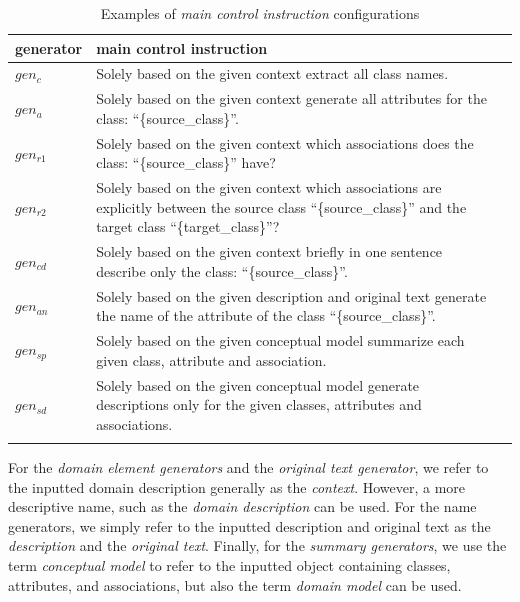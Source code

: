 \begin{table}[!h]
    \scriptsize
    \centering
    \setlength{\tabcolsep}{0.5em}
\begin{tabular}{@{}l>{\raggedright\arraybackslash}p{}>{\raggedright\arraybackslash}p{}@{}}
    generator & main control instruction \\
    \toprule
    \addlinespace
    
$gen_c$ & Solely based on the given context extract all class names. \\
\addlinespace

$gen_a$ & Solely based on the given context generate all attributes for the class: ``\{source\_class\}''. \\
\addlinespace

$gen_{r1}$ & Solely based on the given context which associations does the class: ``\{source\_class\}'' have? \\
\addlinespace

$gen_{r2}$ & Solely based on the given context which associations are explicitly between the source class ``\{source\_class\}'' and the target class ``\{target\_class\}''? \\
\addlinespace

$gen_{cd}$ & Solely based on the given context briefly in one sentence describe only the class: ``\{source\_class\}''. \\
\addlinespace

$gen_{an}$ & Solely based on the given description and original text generate the name of the attribute of the class ``\{source\_class\}''. \\
\addlinespace

$gen_{sp}$ & Solely based on the given conceptual model summarize each given class, attribute and association. \\
\addlinespace

$gen_{sd}$ & Solely based on the given conceptual model generate descriptions only for the given classes, attributes and associations. \\
\addlinespace

	\bottomrule
	\addlinespace
	\end{tabular}
	\caption{Examples of \emph{main control instruction} configurations}
	\label{tab:main_control_instructions}
\end{table}


For the \emph{domain element generators} and the \emph{original text generator}, we refer to the inputted domain description generally as the \emph{context}. However, a more descriptive name, such as the \emph{domain description} can be used. For the name generators, we simply refer to the inputted description and original text as the \emph{description} and the \emph{original text}. Finally, for the \emph{summary generators}, we use the term \emph{conceptual model} to refer to the inputted object containing classes, attributes, and associations, but also the term \emph{domain model} can be used.

